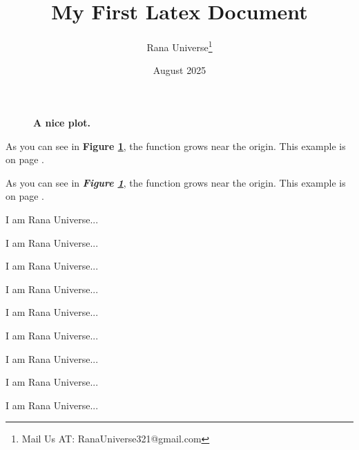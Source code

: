 \documentclass[12pt, letterpaper]{article}
\title{My First Latex Document}
\author{Rana Universe\thanks{Mail Us AT: RanaUniverse321@gmail.com}}
\date{August 2025}
\begin{document}
\maketitle








\begin{figure}[h]   %
    \centering   %



    \caption{\textbf{A nice plot.}}   
    \label{fig:mesh1}   %
\end{figure}

As you can see in \textbf{Figure \ref{fig:mesh1}}, the function grows near the origin. This example is on page \pageref{fig:mesh1}.


As you can see in \textbf{\textit{Figure \ref{fig:mesh1}}}, the function grows near the origin. This example is on page \pageref{fig:mesh1}.





\vspace{10em}

I am Rana Universe...

I am Rana Universe...

I am Rana Universe...

I am Rana Universe...

I am Rana Universe...

I am Rana Universe...

I am Rana Universe...

I am Rana Universe...

I am Rana Universe...

\vspace{3em}





\lipsum[1]

\lipsum[2]

\vspace{1em}

\lipsum[1]




\end{document}
